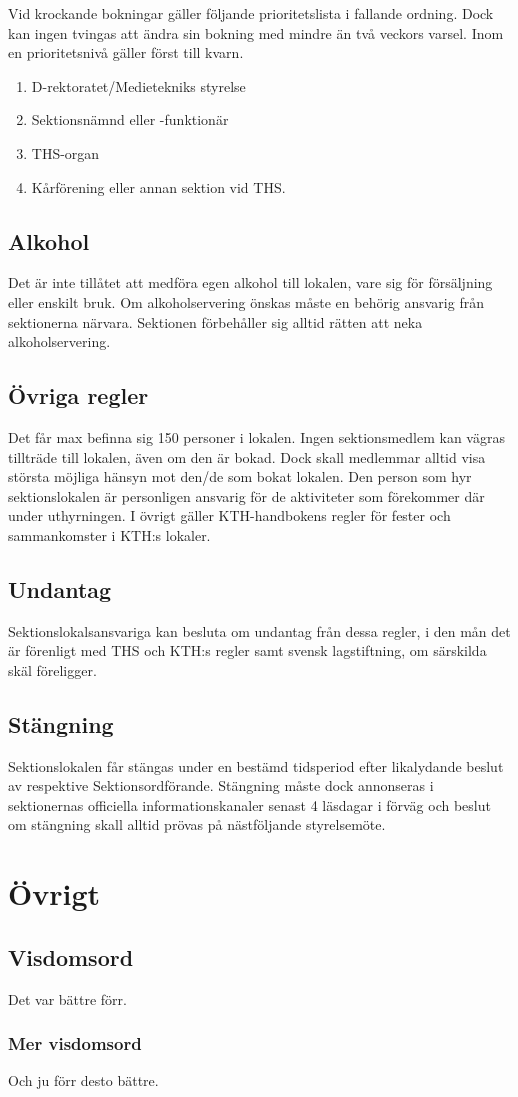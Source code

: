 \documentclass{dgovdoc}
\begin{document}
Vid krockande bokningar gäller följande prioritetslista i fallande ordning. Dock kan
ingen tvingas att ändra sin bokning med mindre än två veckors varsel. Inom en prioritetsnivå gäller först till kvarn.

\begin{enumerate}
  \item D-rektoratet/Medietekniks styrelse
  \item Sektionsnämnd eller -funktionär
  \item THS-organ
  \item Kårförening eller annan sektion vid THS.
\end{enumerate}

\subsection{Alkohol}

Det är inte tillåtet att medföra egen alkohol till lokalen, vare sig för försäljning eller enskilt bruk. Om alkoholservering önskas måste en behörig ansvarig från sektionerna närvara. Sektionen förbehåller sig alltid rätten att neka alkoholservering.

\subsection{Övriga regler}

Det får max befinna sig 150 personer i lokalen. Ingen sektionsmedlem kan
vägras tillträde till lokalen, även om den är bokad. Dock skall medlemmar alltid visa största möjliga hänsyn mot den/de som bokat lokalen. Den person som hyr sektionslokalen är personligen ansvarig för de aktiviteter som förekommer där under uthyrningen. I övrigt gäller KTH-handbokens regler för
fester och sammankomster i KTH:s lokaler.

\subsection{Undantag}

Sektionslokalsansvariga kan besluta om undantag från dessa regler, i den mån det är förenligt med THS och KTH:s regler samt svensk lagstiftning, om särskilda skäl föreligger.

\subsection{Stängning}

Sektionslokalen får stängas under en bestämd tidsperiod efter likalydande beslut av respektive Sektionsordförande. Stängning måste dock annonseras i sektionernas officiella informationskanaler senast 4 läsdagar i förväg och beslut om stängning skall alltid prövas på nästföljande styrelsemöte.

\section{Övrigt}

\subsection{Visdomsord}

Det var bättre förr.

\subsubsection{Mer visdomsord}

Och ju förr desto bättre.
\end{document}
